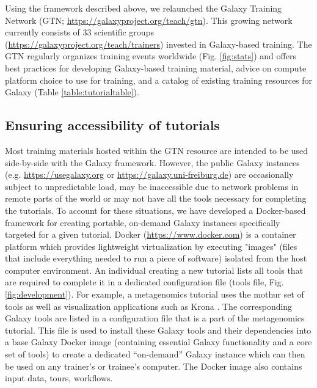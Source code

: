 Using the framework described above, we relaunched the Galaxy Training Network (GTN; \url{https://galaxyproject.org/teach/gtn}). This growing network currently consists of 33 scientific groups (\url{https://galaxyproject.org/teach/trainers}) invested in Galaxy-based training. The GTN regularly organizes training events worldwide (Fig. \ref{fig:stats}) and offers best practices for developing Galaxy-based training material, advice on compute platform choice to use for training, and a catalog of existing training resources for Galaxy (Table \ref{table:tutorialtable}).

\subsection*{Ensuring accessibility of tutorials}
Most training materials hosted within the GTN resource are intended to be used side-by-side with the Galaxy framework. However, the public Galaxy instances (e.g. \url{https://usegalaxy.org} or \url{https://galaxy.uni-freiburg.de}) are occasionally subject to unpredictable load, may be inaccessible due to network problems in remote parts of the world or may not have all the tools necessary for completing the tutorials. To account for these situations, we have developed a Docker-based framework for creating portable, on-demand Galaxy instances specifically targeted for a given tutorial. Docker (\url{https://www.docker.com}) is a container platform which provides lightweight virtualization by executing "images" (files that include everything needed to run a piece of software) isolated from the host computer environment. An individual creating a new tutorial lists all tools that are required to complete it in a dedicated configuration file (tools file, Fig. \ref{fig:development}). For example, a metagenomics tutorial uses the mothur \cite{schloss2009introducing} set of tools as well as visualization applications such as Krona \cite{ondov2015krona}. The corresponding Galaxy tools are listed in a configuration file that is a part of the metagenomics tutorial. This file is used to install these Galaxy tools and their dependencies into a base Galaxy Docker image (containing essential Galaxy functionality and a core set of tools) to create a dedicated “on-demand” Galaxy instance which can then be used on any trainer’s or trainee’s computer. The Docker image also contains input data, tours, workflows.

